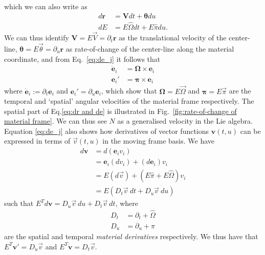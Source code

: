 which we can also write as
\begin{subequations}
\begin{align}
d \mathbf{r} & = \mathbf{V} dt + \boldsymbol{\theta} du \\
d E & = E \hat{\Omega} dt + E \hat{\pi} du. 
\end{align}
\end{subequations}
We can thus identify $\mathbf{V} = E \vec{V} = \partial_t \mathbf{r}$ as the translational velocity of the center-line, $\boldsymbol{\theta} = E \vec{\theta} = \partial_u \mathbf{r}$ as rate-of-change of the center-line along the material coordinate, and from Eq.~\ref{eq:de_j} it follows that
\begin{subequations}
\begin{align}
\dot{\mathbf{e}}_i & = \boldsymbol{\Omega} \times \mathbf{e}_i \\
\mathbf{e}_i' & = \boldsymbol{\pi} \times \mathbf{e}_i \label{eq:eom for e_i along u}
\end{align}
\end{subequations}
where $\dot{\mathbf{e}}_i := \partial_t \mathbf{e}_i$ and $\mathbf{e}_i' = \partial_u \mathbf{e}_i$, which show that $\boldsymbol{\Omega} = E \vec{\Omega}$ and $\boldsymbol{\pi} = E \vec{\pi}$ are the temporal and `spatial' angular velocities of the material frame respectively. The spatial part of Eq.\ref{eq:dr and de} is illustrated in Fig.~\ref{fig:rate-of-change of material frame}.  We can thus see $N$ as a generalised velocity in the Lie algebra. Equation \ref{eq:de_j} also shows how derivatives of vector functions $\mathbf{v}(t,u)$ can be expressed in terms of $\vec{v}(t,u)$ in the moving frame basis. We have
\begin{equation}
\begin{aligned}
d \mathbf{v} & = d(\mathbf{e}_i v_i) \\
& = \mathbf{e}_i (d v_i) + (d \mathbf{e}_i) v_i \\
& = E (d \vec{v}) + (E \hat{\pi} + E \hat{\Omega}) v_i \\
& = E (D_t \vec{v}\ dt + D_u \vec{v}\ du) 
\end{aligned}
\end{equation}
such that $E^T d \mathbf{v} = D_u \vec{v}\ du + D_t \vec{v}\ dt$, where
\begin{subequations} \label{eq:covariant derivatives}
\begin{align}
D_t & = \partial_t + \hat{\Omega}  \\
D_u & = \partial_u + \hat{\pi} 
\end{align}
\end{subequations}
are the spatial and temporal \textit{material derivatives} respectively. We thus have that $E^T \mathbf{v}' = D_u \vec{v}$  and $E^T \dot{\mathbf{v}} = D_t \vec{v}$.

